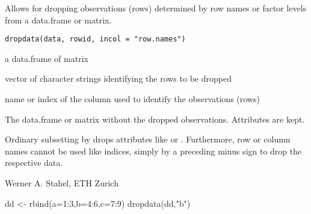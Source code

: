 \documentclass{article}
\begin{document}
\begin{Description}\relax
Allows for dropping observations (rows) determined by row names or
factor levels from a data.frame or matrix.
\end{Description}
\begin{Usage}
\begin{verbatim}
dropdata(data, rowid, incol = "row.names")
\end{verbatim}
\end{Usage}
\begin{Arguments}
\begin{ldescription}
\item[\code{data}] a data.frame of matrix
\item[\code{rowid}] vector of character strings identifying the rows to be
dropped
\item[\code{incol}] name or index of the column used to identify the
observations (rows)
\end{ldescription}
\end{Arguments}
\begin{Value}
The data.frame or matrix without the dropped observations.
Attributes are kept.
\end{Value}
\begin{Note}\relax
Ordinary subsetting by \code{[...,...]} drops attributes like
 or . Furthermore, row or column
names cannot be used like indices, simply by a preceding minus sign to
drop the respective data.
\end{Note}
\begin{Author}\relax
Werner A. Stahel, ETH Zurich
\end{Author}
\begin{Examples}
\begin{ExampleCode}
dd <- rbind(a=1:3,b=4:6,c=7:9)
dropdata(dd,"b")
\end{ExampleCode}
\end{Examples}
\end{document}
